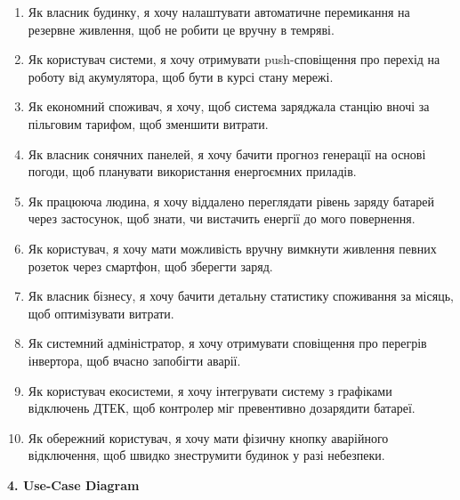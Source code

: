 \documentclass[14pt, a4paper]{extreport}
\begin{document}
	\begin{enumerate}
		\item Як власник будинку, я хочу налаштувати автоматичне перемикання на резервне живлення, щоб не робити це вручну в темряві.
		
		\item Як користувач системи, я хочу отримувати push-сповіщення про перехід на роботу від акумулятора, щоб бути в курсі стану мережі.
		
		\item Як економний споживач, я хочу, щоб система заряджала станцію вночі за пільговим тарифом, щоб зменшити витрати.
		
		\item Як власник сонячних панелей, я хочу бачити прогноз генерації на основі погоди, щоб планувати використання енергоємних приладів.
		
		\item Як працююча людина, я хочу віддалено переглядати рівень заряду батарей через застосунок, щоб знати, чи вистачить енергії до мого повернення.
		
		\item Як користувач, я хочу мати можливість вручну вимкнути живлення певних розеток через смартфон, щоб зберегти заряд.
		
		\item Як власник бізнесу, я хочу бачити детальну статистику споживання за місяць, щоб оптимізувати витрати.
		
		\item Як системний адміністратор, я хочу отримувати сповіщення про перегрів інвертора, щоб вчасно запобігти аварії.
		
		\item Як користувач екосистеми, я хочу інтегрувати систему з графіками відключень ДТЕК, щоб контролер міг превентивно дозарядити батареї.
		
		\item Як обережний користувач, я хочу мати фізичну кнопку аварійного відключення, щоб швидко знеструмити будинок у разі небезпеки.
	\end{enumerate}

	\textbf{4. Use-Case Diagram}
	
\end{document}
